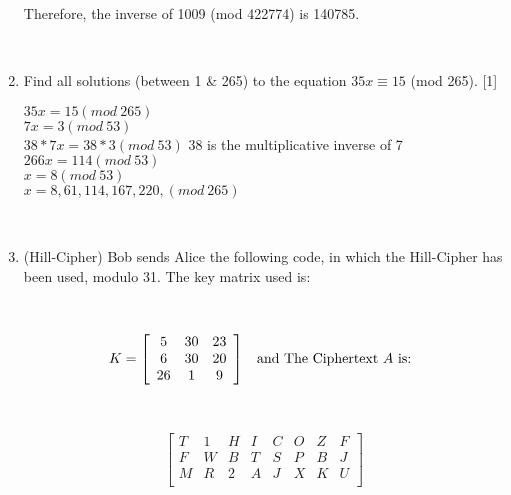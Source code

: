 \documentclass[12pt,emtex]{article}
\begin{document}
\begin{enumerate}
    Therefore, the inverse of 1009 (mod 422774) is 140785.


\

	 \item  Find all solutions (between 1 \& 265) to the equation $35x \equiv 15$ (mod 265).         \hfill     [1]
	 
      $35x = 15 (mod\ 265)$ \\
      $7x = 3 (mod\ 53)$ \\
      $38 * 7x = 38 * 3 (mod\ 53)$ 38 is the multiplicative inverse of 7 \\ 
      $266x = 114 (mod\ 53)$ \\
      $x = 8 (mod\ 53)$ \\
      $x = 8, 61, 114, 167, 220,  (mod\ 265)$
      


\newpage


\

\vspace{-25mm}
          \item   (Hill-Cipher) Bob sends Alice the following code, in which the Hill-Cipher has been used, modulo 31. The key matrix used is:
    
          \vspace{-6mm}
            
            \
            
             	\[ K = 
            \left[
            	\begin{array}{cccccccccc}
                    5	&	30	& 	23 \\
                    6	&	30	& 	20 \\
                    26	&	1	&	9 \\
            \end{array}
            \right]
            \hspace{3mm}
             \mbox{and The Ciphertext $A$ is:  }
             \medskip
            \] 
          
          \
          
          \vspace{-6mm}
            
         \[  
            \left[
            \begin{array}{ccccccccccccccc}
T	&	1	&	H	&	I	&	C	&	O	&	Z	&	F	\\
F	&	W	&	B	&	T	&	S	&	P	&	B	&	J	\\
M	&	R	&	2	&	A	&	J	&	X	&	K	&	U	\\
           \end{array}
            \right]
            \]
            

\end{enumerate}
\end{document}

